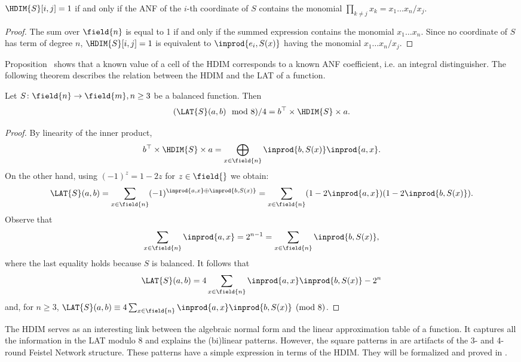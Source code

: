 \begin{proposition}
$\HDIM{S}[i,j] = 1$ if and only if the ANF of the $i$-th coordinate of $S$ contains the monomial $\prod_{k \ne j}x_k=x_1\ldots x_n/x_j$.
\end{proposition}
\begin{proof}
The sum over $\field{n}$ is equal to 1 if and only if the summed expression contains the monomial $x_1\ldots x_n$. Since no coordinate of $S$ has term of degree $n$, $\HDIM{S}[i,j] = 1$ is equivalent to $\inprod{e_i,S(x)}$ having the monomial $x_1\ldots x_n/x_j$.
\end{proof}

Proposition~ shows that a known value of a cell of the HDIM corresponds to a known ANF coefficient, i.e. an integral distinguisher. The following theorem describes the relation between the HDIM and the LAT of a function.

\begin{theorem}
Let $S\colon \field{n} \to \field{m}, n \ge 3$ be a balanced function. Then
$$(\LAT{S}(a,b) \mod{8})/4 = b^\top \times \HDIM{S} \times a.$$
\end{theorem}
\begin{proof}
By linearity of the inner product,
$$
b^\top \times \HDIM{S} \times a = \bigoplus_{x\in \field{n}} \inprod{b,S(x)}\inprod{a,x}.
$$
On the other hand, using $(-1)^z = 1-2z$ for $z\in\field{}$ we obtain:
$$
\LAT{S}(a,b) =
\sum_{x\in \field{n}}(-1)^{\inprod{a,x} \oplus \inprod{b,S(x)}} =
\sum_{x\in \field{n}} (1-2\inprod{a,x})(1-2\inprod{b,S(x)}).
$$
Observe that
$$
\sum_{x\in\field{n}}\inprod{a,x} = 2^{n-1} = \sum_{x\in\field{n}}\inprod{b,S(x)},
$$
where the last equality holds because $S$ is balanced.
It follows that
$$
\LAT{S}(a,b) =
4\sum_{x\in\field{n}}\inprod{a,x}\inprod{b,S(x)} - 2^n
$$
and, for $n \ge 3$, $\LAT{S}(a,b) \equiv 4\sum_{x\in \field{n}}\inprod{a,x}\inprod{b,S(x)}\pmod{8}$.
\end{proof}

The HDIM serves as an interesting link between the algebraic normal form and the linear approximation table of a function. It captures all the information in the LAT modulo 8 and explains the (bi)linear patterns. However, the square patterns in  are artifacts of the 3- and 4-round Feistel Network structure. These patterns have a simple expression in terms of the HDIM. They will be formalized and proved in .


